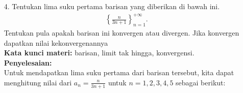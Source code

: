 \documentclass[10pt,openany,a4paper]{article}
\theoremstyle{definition}
\theoremstyle{definition}
\theoremstyle{plain}
\newenvironment{jawab}[2][tes]{
\textbf{Kata kunci materi:} #1.\\
\textbf{Penyelesaian:} #2
}{}
\newenvironment{jawaban}[2][tes]{
\colorlet{oldcolor}{.}
        \color{red}
        \setlength{\fboxrule}{1pt}\boxed{\color{oldcolor}#2}\color{oldcolor}.
}{}
\begin{document}
\begin{enumerate}
\begin{jawab}
{\begin{align*}
\end{align*}
Selanjutnya, didapatkan luas daerah $L_2$ yang dibatasi oleh kurva $r=4+4\cos\theta$ untuk $\theta$ dari $\frac{\pi}{3}$ hingga $\pi$ sebagai berikut:
\allowdisplaybreaks
\begin{align*}
L_2 &= \frac{1}{2} \int_{0}^{\frac{\pi}{3}} (4+4\cos\theta)^2 d\theta \\  
&= \frac{1}{2} \int_{0}^{\frac{\pi}{3}} (16 + 32\cos\theta + 16\cos^2\theta) d\theta \\
&= \frac{1}{2} \int_{0}^{\frac{\pi}{3}} (16 + 32\cos\theta + 16\cdot\frac{1+\cos(2\theta)}{2}) d\theta \\
&= \frac{1}{2} \int_{0}^{\frac{\pi}{3}} (16 + 32\cos\theta + 8 + 8\cos(2\theta)) d\theta \\
&= \frac{1}{2} \int_{0}^{\frac{\pi}{3}} (24 + 32\cos\theta + 8\cos(2\theta)) d\theta \\
&= \frac{1}{2} \left[ 24\theta + 32\sin\theta + 4\sin(2\theta) \right]_{0}^{\frac{\pi}{3}} \\
&= \frac{1}{2} \left[ (24\cdot\frac{\pi}{3} + 32\sin\frac{\pi}{3} + 4\sin\frac{2\pi}{3}) - (0 + 0 + 0) \right] \\
&= \frac{1}{2} \left[ 8\pi + 32\cdot\frac{\sqrt{3}}{2} + 4\cdot\frac{\sqrt{3}}{2} \right] \\
&= \frac{1}{2} \left[ 8\pi + 16\sqrt{3} + 2\sqrt{3} \right] \\
&= \frac{1}{2} \left[ 8\pi + 18\sqrt{3} \right] \\
&= \colorlet{oldcolor}{.}
        \color{blue}        \setlength{\fboxrule}{1pt} \boxed{\color{oldcolor}4\pi + 9\sqrt{3}}\color{oldcolor}.
\end{align*}
Dengan demikian, luas daerah di luar lingkaran $r=6$ dan di dalam kardioda $r=4+4\cos\theta$ adalah $L=2(L_2-L1) = 2((4\pi + 9\sqrt{3}) - 6\pi) = \begin{jawaban}{18\sqrt{3}-4\pi}\end{jawaban}$
            }
            \end{jawab}
            \item[4.] Tentukan lima suku pertama barisan yang diberikan di bawah ini.
            \begin{align*}
                \left\{\frac{n}{3n+1}\right\}^{+\infty}_{n=1}.
            \end{align*}
            Tentukan pula apakah barisan ini konvergen atau divergen. Jika konvergen dapatkan nilai kekonvergenannya
            \\
            \begin{jawab}[barisan, limit tak hingga, konvergensi]{\\Untuk mendapatkan lima suku pertama dari barisan tersebut, kita dapat menghitung nilai dari $a_n=\frac{n}{3n+1}$ untuk $n=1,2,3,4,5$ sebagai berikut:
}
\end{jawab}
\end{enumerate}
\end{document}
